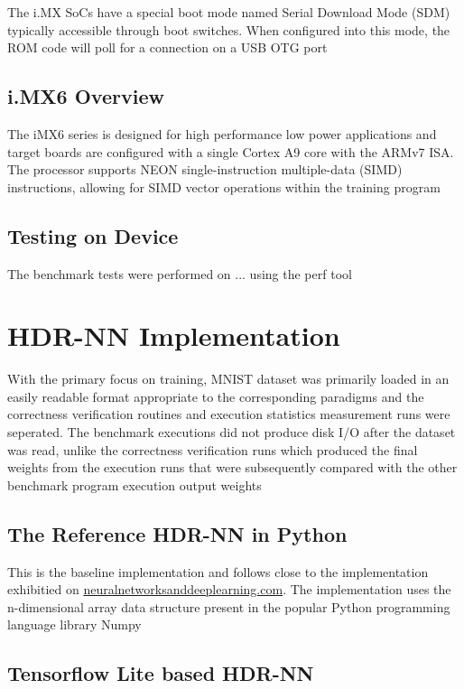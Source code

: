 The i.MX SoCs have a special boot mode named Serial Download Mode (SDM) typically accessible through boot switches. When configured into this mode, the ROM code will poll for a connection on a USB OTG port

\subsection[ECU / iMX6 Evaluation Board Overview]{i.MX6 Overview}

The iMX6 series is designed for high performance low power applications and target boards are configured with a single Cortex A9 core with the ARMv7 ISA. The processor supports NEON single-instruction multiple-data (SIMD) instructions, allowing for SIMD vector operations within the training program

\subsection{Testing on Device}

The benchmark tests were performed on ... using the perf tool

\section{HDR-NN Implementation}

With the primary focus on training, MNIST dataset was primarily loaded in an easily readable format appropriate to the corresponding paradigms and the correctness verification routines and execution statistics measurement runs were seperated. The benchmark executions did not produce disk I/O after the dataset was read, unlike the correctness verification runs which produced the final weights from the execution runs that were subsequently compared with the other benchmark program execution output weights

\subsection[Python - Numpy]{The Reference HDR-NN in Python}

This is the baseline implementation and follows close to the implementation exhibitied on \href{http://neuralnetworksanddeeplearning.com}{neuralnetworksanddeeplearning.com}. The implementation uses the n-dimensional array data structure present in the popular Python programming language library Numpy

\subsection[Tensorflow Lite]{Tensorflow Lite based HDR-NN}

